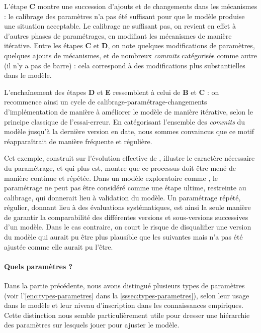 L'étape \textbf{C} montre une succession d'ajouts et de changements dans les mécanismes : le calibrage des paramètres n'a pas été suffisant pour que le modèle produise une situation acceptable.
Le calibrage ne suffisant pas, on revient en effet à d'autres phases de paramétrages, en modifiant les mécanismes de manière itérative.
Entre les étapes \textbf{C} et \textbf{D}, on note quelques modifications de paramètres, quelques ajouts de mécanismes, et de nombreux \textit{commits} catégorisés comme \og autre\fg{} (il n'y a pas de barre) : cela correspond à des modifications plus substantielles dans le modèle.

L'enchaînement des étapes \textbf{D} et \textbf{E} ressemblent à celui de \textbf{B} et \textbf{C} : on recommence ainsi un cycle de calibrage-paramétrage-changements d'implémentation de manière à améliorer le modèle de manière itérative, selon le principe classique de l'essai-erreur.
En catégorisant l'ensemble des \textit{commits} du modèle jusqu'à la dernière version en date, nous sommes convaincus que ce motif réapparaîtrait de manière fréquente et régulière.

Cet exemple, construit sur l'évolution effective de \simfeodal{}, illustre le caractère nécessaire du paramétrage, et qui plus est, montre que ce processus doit être mené de manière continue et répétée.
Dans un modèle exploratoire comme \simfeodal{}, le paramétrage ne peut pas être considéré comme une étape ultime, restreinte au calibrage, qui donnerait lieu à validation du modèle.
Un paramétrage répété, régulier, donnant lieu à des évaluations systématiques, est ainsi la seule manière de garantir la comparabilité des différentes versions et sous-versions successives d'un modèle.
Dans le cas contraire, on court le risque de disqualifier une version du modèle qui aurait pu être plus plausible que les suivantes mais n'a pas été ajustée comme elle aurait pu l'être.

\paragraph{Quels paramètres ?} \label{sssec:quels-parametres}

Dans la partie précédente, nous avons distingué plusieurs types de paramètres (voir l'\cref{enc:types-parametres} dans la \cref{sssec:types-parametres}), selon leur usage dans le modèle et leur niveau d'inscription dans les connaissances empiriques.
Cette distinction nous semble particulièrement utile pour dresser une hiérarchie des paramètres sur lesquels jouer pour ajuster le modèle.

